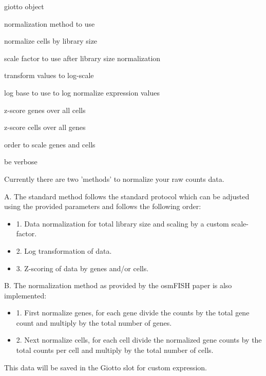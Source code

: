 \documentclass[a4paper]{book}
\begin{document}
%
\begin{Arguments}
\begin{ldescription}
\item[\code{gobject}] giotto object

\item[\code{norm\_methods}] normalization method to use

\item[\code{library\_size\_norm}] normalize cells by library size

\item[\code{scalefactor}] scale factor to use after library size normalization

\item[\code{log\_norm}] transform values to log-scale

\item[\code{logbase}] log base to use to log normalize expression values

\item[\code{scale\_genes}] z-score genes over all cells

\item[\code{scale\_cells}] z-score cells over all genes

\item[\code{scale\_order}] order to scale genes and cells

\item[\code{verbose}] be verbose
\end{ldescription}
\end{Arguments}
%
\begin{Details}\relax
Currently there are two 'methods' to normalize your raw counts data.

A. The standard method follows the standard protocol which can be adjusted using
the provided parameters and follows the following order: \\{}
\begin{itemize}

\item{} 1. Data normalization for total library size and scaling by a custom scale-factor.
\item{} 2. Log transformation of data.
\item{} 3. Z-scoring of data by genes and/or cells.

\end{itemize}

B. The normalization method as provided by the osmFISH paper is also implemented: \\{}
\begin{itemize}

\item{} 1. First normalize genes, for each gene divide the counts by the total gene count and
multiply by the total number of genes.
\item{} 2. Next normalize cells, for each cell divide the normalized gene counts by the total
counts per cell and multiply by the total number of cells.

\end{itemize}

This data will be saved in the Giotto slot for custom expression.
\end{Details}
\end{document}
